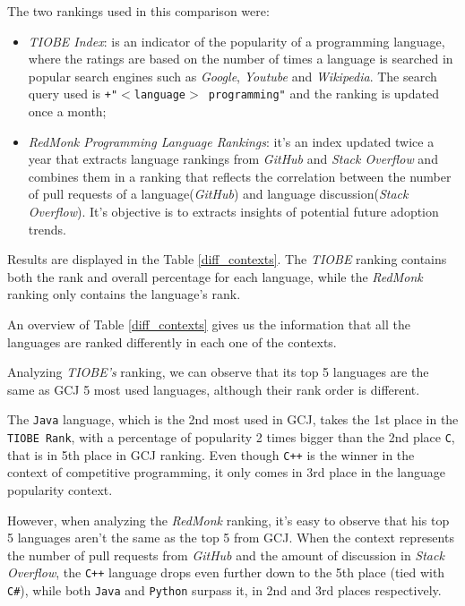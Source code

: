 \documentclass{article}
\begin{document}
\begin{multicols*}{2}
The two rankings used in this comparison were:
\begin{itemize}
    \item \textit{TIOBE Index}: is an indicator of the popularity of a programming language\cite{tiobe}, where the ratings are based on the number of times a language is searched in popular search engines such as \textit{Google}, \textit{Youtube} and \textit{Wikipedia}. The search query used is \texttt{+"$<$language$>$ programming"} and the ranking is updated once a month;
    \item \textit{RedMonk Programming Language Rankings}: it's an index updated twice a year that extracts language rankings from \textit{GitHub} and \textit{Stack Overflow} and combines them in a ranking that reflects the correlation between the number of pull requests of a language(\textit{GitHub}) and language discussion(\textit{Stack Overflow})\cite{redmonk}. It's objective is to extracts insights of potential future adoption trends.
\end{itemize}


Results are displayed in the Table \ref{diff_contexts}. The \textit{TIOBE} ranking contains both the rank and overall percentage for each language, while the \textit{RedMonk} ranking only contains the language's rank.

An overview of Table \ref{diff_contexts} gives us the information that all the languages are ranked differently in each one of the contexts.


Analyzing \textit{TIOBE's} ranking, we can observe that its top 5 languages are the same as GCJ 5 most used languages, although their rank order is different.

The \texttt{Java} language, which is the 2nd most used in GCJ, takes the 1st place in the \texttt{TIOBE Rank}, with a percentage of popularity 2 times bigger than the 2nd place \texttt{C}, that is in 5th place in GCJ ranking. Even though \texttt{C++} is the winner in the context of competitive programming, it only comes in 3rd place in the language popularity context.


However, when analyzing the \textit{RedMonk} ranking, it's easy to observe that his top 5 languages aren't the same as the top 5 from GCJ. When the context represents the number of pull requests from \textit{GitHub} and the amount of discussion in \textit{Stack Overflow}, the \texttt{C++} language drops even further down to the 5th place (tied with \texttt{C\#}), while both \texttt{Java} and \texttt{Python} surpass it, in 2nd and 3rd places respectively.


\end{multicols*}
\end{document}
